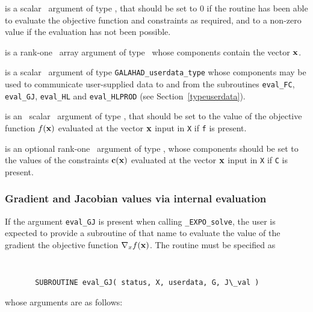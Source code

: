 \documentclass{galahad}
\newcommand{\packagename}{EXPO}
\newcommand{\fullpackagename}{\libraryname\_\packagename}
\newcommand{\solver}{{\tt \fullpackagename\_solve}}
\begin{document}
\begin{description}
 is a scalar \intentout\ argument of type \integer,
that should be set to 0 if the routine has been able to evaluate
the objective function and constraints as required,
and to a non-zero value if the evaluation has not been possible.

 is a rank-one \intentin\ array argument of type \realdp\
whose components contain the vector ${\mathbf{x}}$.

 is a scalar \intentinout\ argument of type
{\tt GALAHAD\_userdata\_type} whose components may be used
to communicate user-supplied data to and from the
subroutines {\tt eval\_FC}, {\tt eval\_GJ},
{\tt eval\_HL} and {\tt eval\_HLPROD}
(see Section~\ref{typeuserdata}).

 is an \optional\ scalar \intentout\ argument of type \realdp,
that should be set to the value of the objective function $f({\mathbf{x}})$
evaluated at the vector ${\mathbf{x}}$ input in {\tt X} if {\tt f} is present.

 is an optional rank-one \intentout\ argument of type \realdp,
whose components should be set to the values of the constraints
${\mathbf{c}}({\mathbf{x}})$ evaluated at the vector ${\mathbf{x}}$ input in {\tt X} 
if {\tt C} is present.

\end{description}


\subsubsection{Gradient and Jacobian values via internal evaluation\label{gjfv}}

If the argument {\tt eval\_GJ} is present when calling \solver, the
user is expected to provide a subroutine of that name to evaluate the
value of the gradient the objective function $\nabla_x f({\mathbf{x}})$.
The routine must be specified as

\def\baselinestretch{0.8}
{\tt
\begin{verbatim}
       SUBROUTINE eval_GJ( status, X, userdata, G, J\_val )
\end{verbatim} }
\def\baselinestretch{1.0}
\noindent whose arguments are as follows:
\end{document}
